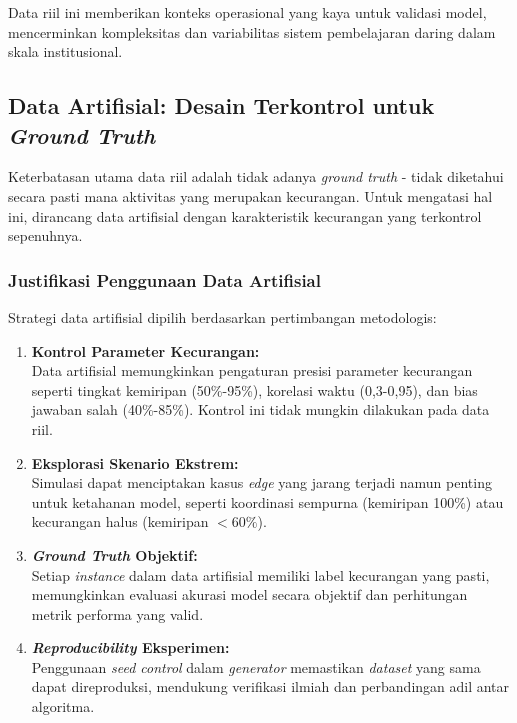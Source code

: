 Data riil ini memberikan konteks operasional yang kaya untuk validasi model, mencerminkan kompleksitas dan variabilitas sistem pembelajaran daring dalam skala institusional.

\subsection{Data Artifisial: Desain Terkontrol untuk \textit{Ground Truth}}
\label{sec:dataArtifisial}

Keterbatasan utama data riil adalah tidak adanya \textit{ground truth} - tidak diketahui secara pasti mana aktivitas yang merupakan kecurangan. Untuk mengatasi hal ini, dirancang data artifisial dengan karakteristik kecurangan yang terkontrol sepenuhnya.

\subsubsection{Justifikasi Penggunaan Data Artifisial}
\label{sec:justifikasiDataArtifisial}

Strategi data artifisial dipilih berdasarkan pertimbangan metodologis:

\begin{enumerate}
    \item \textbf{Kontrol Parameter Kecurangan:} \\
    Data artifisial memungkinkan pengaturan presisi parameter kecurangan seperti tingkat kemiripan (50\%-95\%), korelasi waktu (0,3-0,95), dan bias jawaban salah (40\%-85\%). Kontrol ini tidak mungkin dilakukan pada data riil.
    
    \item \textbf{Eksplorasi Skenario Ekstrem:} \\
    Simulasi dapat menciptakan kasus \textit{edge} yang jarang terjadi namun penting untuk ketahanan model, seperti koordinasi sempurna (kemiripan 100\%) atau kecurangan halus (kemiripan $<60\%$).
    
    \item \textbf{\textit{Ground Truth} Objektif:} \\
    Setiap \textit{instance} dalam data artifisial memiliki label kecurangan yang pasti, memungkinkan evaluasi akurasi model secara objektif dan perhitungan metrik performa yang valid.
    
    \item \textbf{\textit{Reproducibility} Eksperimen:} \\
    Penggunaan \textit{seed control} dalam \textit{generator} memastikan \textit{dataset} yang sama dapat direproduksi, mendukung verifikasi ilmiah dan perbandingan adil antar algoritma.
\end{enumerate}

